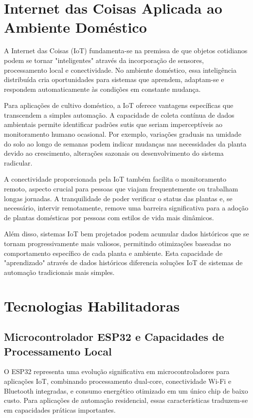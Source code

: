 \documentclass[twoside,english,brazilian]{UNISINOSmonografia}
\begin{document}
\section{Internet das Coisas Aplicada ao Ambiente Doméstico}

A Internet das Coisas (IoT) fundamenta-se na premissa de que objetos cotidianos podem se tornar "inteligentes" através da incorporação de sensores, processamento local e conectividade. No ambiente doméstico, essa inteligência distribuída cria oportunidades para sistemas que aprendem, adaptam-se e respondem automaticamente às condições em constante mudança.

Para aplicações de cultivo doméstico, a IoT oferece vantagens específicas que transcendem a simples automação. A capacidade de coleta contínua de dados ambientais permite identificar padrões sutis que seriam imperceptíveis ao monitoramento humano ocasional. Por exemplo, variações graduais na umidade do solo ao longo de semanas podem indicar mudanças nas necessidades da planta devido ao crescimento, alterações sazonais ou desenvolvimento do sistema radicular.

A conectividade proporcionada pela IoT também facilita o monitoramento remoto, aspecto crucial para pessoas que viajam frequentemente ou trabalham longas jornadas. A tranquilidade de poder verificar o status das plantas e, se necessário, intervir remotamente, remove uma barreira significativa para a adoção de plantas domésticas por pessoas com estilos de vida mais dinâmicos.

Além disso, sistemas IoT bem projetados podem acumular dados históricos que se tornam progressivamente mais valiosos, permitindo otimizações baseadas no comportamento específico de cada planta e ambiente. Esta capacidade de "aprendizado" através de dados históricos diferencia soluções IoT de sistemas de automação tradicionais mais simples.

\section{Tecnologias Habilitadoras}

\subsection{Microcontrolador ESP32 e Capacidades de Processamento Local}

O ESP32 representa uma evolução significativa em microcontroladores para aplicações IoT, combinando processamento dual-core, conectividade Wi-Fi e Bluetooth integradas, e consumo energético otimizado em um único chip de baixo custo. Para aplicações de automação residencial, essas características traduzem-se em capacidades práticas importantes.
\end{document}
